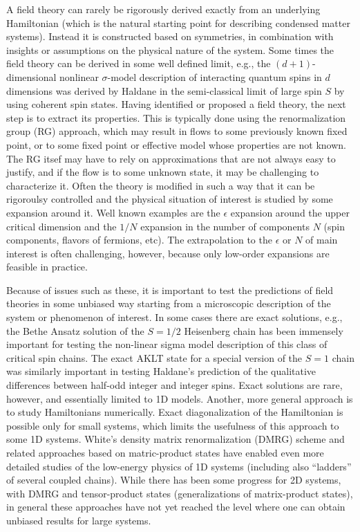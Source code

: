 \documentclass[aps,prb,groupedaddress,twocolumn]{revtex4}
\begin{document}
A field theory can rarely be rigorously derived exactly from 
an underlying Hamiltonian (which is the natural starting point for describing condensed matter systems). Instead
it is constructed based on symmetries, in combination with insights or assumptions on the physical nature of the
system. Some times the field theory can be derived in some well defined limit, e.g., the $(d+1)$-dimensional
nonlinear $\sigma$-model description of interacting quantum spins in $d$ dimensions was derived by Haldane in 
the semi-classical limit of large spin $S$ by using coherent spin states. Having identified or proposed a field
theory, the next step is to extract its properties. This is typically done using the renormalization group (RG)
approach, which may result in flows to some previously known fixed point, or to some fixed point or effective
model whose properties are not known. The RG itsef may have to rely on approximations that are not always easy
to justify, and if the flow is to some unknown state, it may be challenging to characterize it. Often the theory
is modified in such a way that it can be rigoroulsy controlled and the physical situation of interest is studied 
by some expansion around it. Well known examples are the $\epsilon$ expansion around the upper critical dimension 
and the $1/N$ expansion in the number of components $N$ (spin components, flavors of fermions, etc). The
extrapolation to the $\epsilon$ or $N$ of main interest is often challenging, however, because only low-order
expansions are feasible in practice.

Because of issues such as these, it is important to test the predictions of field theories in some unbiased way
starting from a microscopic description of the system or phenomenon of interest. In some
cases there are exact solutions, e.g., the Bethe Ansatz solution of the $S=1/2$ Heisenberg chain has been immensely
important for testing the non-linear sigma model description of this class of critical spin chains. The exact
AKLT state for a special version of the $S=1$ chain was similarly important in testing Haldane's prediction of
the qualitative differences between half-odd integer and integer spins. Exact solutions are rare, however, and
essentially limited to 1D models. Another, more general approach is to study Hamiltonians numerically. Exact
diagonalization of the Hamiltonian is possible only for small systems, which limits the usefulness of this approach 
to some 1D systems. White's density matrix renormalization (DMRG) scheme and related approaches based 
on matric-product states have enabled even more detailed studies of the low-energy physics of 1D systems (including
also ``ladders'' of several coupled chains). While there has been some progress for 2D systems, with
DMRG and tensor-product states (generalizations of matrix-product states), in general these approaches have not
yet reached the level where one can obtain unbiased results for large systems.
\end{document}
